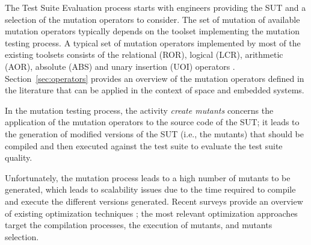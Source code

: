 The Test Suite Evaluation process starts with engineers providing the SUT and a selection of the mutation operators to consider. The set of mutation of available mutation operators typically depends on the toolset implementing the mutation testing process. 
A typical set of mutation operators implemented by most of the existing toolsets consists of the relational (ROR), logical (LCR), arithmetic (AOR), absolute (ABS) and unary insertion (UOI) operators \cite{rothermel1996experimental}. 
Section~\ref{sec:operators} provides an overview of the mutation operators defined in the literature that can be applied in the context of space and embedded systems.

In the mutation testing process, the activity \emph{create mutants} concerns the application of the mutation operators to the source code of the SUT; it leads to the generation of modified versions of the SUT (i.e., the mutants) that should be compiled and then executed against the test suite to evaluate the test suite quality. 

Unfortunately, the mutation process leads to a high number of mutants to be generated, which leads to scalability issues due to the time required to compile and execute the different versions generated. Recent surveys provide an overview of existing optimization techniques \cite{ferrari2018systematic}; the most relevant optimization approaches target the compilation processes, the execution of mutants, and mutants selection. 

